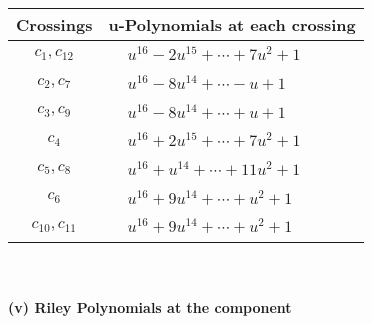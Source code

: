 \documentclass[1p]{elsarticle_modified}
\theoremstyle{definition}
\begin{document}
\begin{tabular}{m{50pt}|m{274pt}}
Crossings & \hspace{64pt}u-Polynomials at each crossing \\
\hline $$\begin{aligned}c_{1},c_{12}\end{aligned}$$&$\begin{aligned}
&u^{16}-2 u^{15}+\cdots+7 u^2+1
\end{aligned}$\\
\hline $$\begin{aligned}c_{2},c_{7}\end{aligned}$$&$\begin{aligned}
&u^{16}-8 u^{14}+\cdots- u+1
\end{aligned}$\\
\hline $$\begin{aligned}c_{3},c_{9}\end{aligned}$$&$\begin{aligned}
&u^{16}-8 u^{14}+\cdots+u+1
\end{aligned}$\\
\hline $$\begin{aligned}c_{4}\end{aligned}$$&$\begin{aligned}
&u^{16}+2 u^{15}+\cdots+7 u^2+1
\end{aligned}$\\
\hline $$\begin{aligned}c_{5},c_{8}\end{aligned}$$&$\begin{aligned}
&u^{16}+u^{14}+\cdots+11 u^2+1
\end{aligned}$\\
\hline $$\begin{aligned}c_{6}\end{aligned}$$&$\begin{aligned}
&u^{16}+9 u^{14}+\cdots+u^2+1
\end{aligned}$\\
\hline $$\begin{aligned}c_{10},c_{11}\end{aligned}$$&$\begin{aligned}
&u^{16}+9 u^{14}+\cdots+u^2+1
\end{aligned}$\\
\hline
\end{tabular}\\~\\
\newpage\renewcommand{\arraystretch}{1}
\flushleft \textbf{(v) Riley Polynomials at the component}\newline \\
\end{document}
